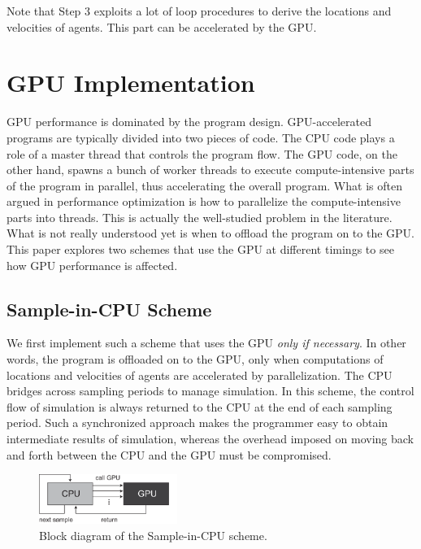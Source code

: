 \documentclass[times, 10pt, twocolumn]{article}
\begin{document}
Note that Step 3 exploits a lot of loop procedures to derive the
locations and velocities of agents.
This part can be accelerated by the GPU.

\section{GPU Implementation}
\label{sec:gpu_implementations}

GPU performance is dominated by the program design.
GPU-accelerated programs are typically divided into two pieces of code.
The CPU code plays a role of a master thread that controls the program
flow.
The GPU code, on the other hand, spawns a bunch of worker threads to
execute compute-intensive parts of the program in parallel, thus
accelerating the overall program.
What is often argued in performance optimization is how to parallelize
the compute-intensive parts into threads.
This is actually the well-studied problem in the literature.
What is not really understood yet is when to offload the program on to
the GPU.
This paper explores two schemes that use the GPU at different timings to
see how GPU performance is affected.

\subsection{Sample-in-CPU Scheme}
\label{sec:sample-in-cpu}

We first implement such a scheme that uses the GPU \textit{only if
necessary}.
In other words, the program is offloaded on to the GPU, only when
computations of locations and velocities of agents are accelerated by
parallelization.
The CPU bridges across sampling periods to manage simulation.
In this scheme, the control flow of simulation is always returned to the
CPU at the end of each sampling period.
Such a synchronized approach makes the programmer easy to
obtain intermediate results of simulation, whereas the overhead imposed
on moving back and forth between the CPU and the GPU must be
compromised.

\begin{figure}[t]
\centering
\includegraphics[width=0.4\textwidth]{eps/sample-in-cpu.eps}
\caption{Block diagram of the Sample-in-CPU scheme.}
\label{fig:sample-in-cpu}
\end{figure}
\end{document}
